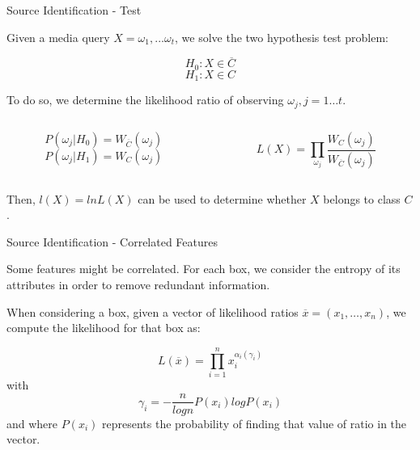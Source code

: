 \begin{tframe}{Source Identification - Test}

Given a media query $X = \omega_{1}, . . . \omega_{t}$, we solve the two hypothesis test problem:

$$  H_{0}:X \in \overline{C} $$
$$  H_{1}:X \in C $$

To do so, we determine the likelihood ratio of observing $\omega_{j}, j = 1 \ldots t$.

\vspace{1cm}

\begin{minipage}{\textwidth}
\begin{columns}[T]

\begin{column}{0.45\textwidth}
$$ P(\omega_{j}\vert H_{0}) = W_{\overline{C}}(\omega_{j}) $$
$$ P(\omega_{j}\vert H_{1}) = W_{C}(\omega_{j}) $$ 
\end{column}

\begin{column}{0.45\textwidth}
$$ L(X) = \prod\limits_{\omega_{j}}\dfrac{W_{C}(\omega_{j}) }{W_{\overline{C}}(\omega_{j})} $$
\end{column}

\end{columns}
\end{minipage}

\vspace{0.5cm}

Then, $l(X) = lnL(X)$ can be used to determine whether $X$ belongs to class $C$.

\end{tframe}

\begin{tframe}{Source Identification - Correlated Features}

Some features might be correlated. For each box, we consider the entropy of its attributes in order to remove redundant information.

\vspace{0.1cm}

When considering a box, given a vector of likelihood ratios $\overline{x} = (x_{1},\ldots,x_{n})$, we compute the likelihood for that box as:

$$ L(\overline{x}) = \prod\limits_{i=1}^{n} x_{i}^{\alpha_{i}(\gamma_{i})} $$ with  $$ \gamma_{i} = - \dfrac{n}{log n} P(x_{i})log P(x_{i}) $$ and where $P(x_{i})$ represents the probability of finding that value of ratio in the vector.

\end{tframe}

